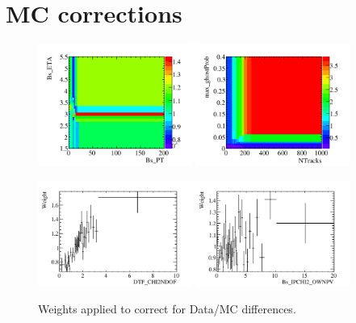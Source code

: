 
\section{MC corrections}

\begin{figure}[h]
\centering
\includegraphics[height=!,width=0.45\textwidth]{figs/dataVsMC/norm_final/weights/weights_Bs_PT_Bs_ETA_Ds2KKpi_1_t0.pdf}
\includegraphics[height=!,width=0.45\textwidth]{figs/dataVsMC/norm_final/weights/weights_NTracks_max_ghostProb_Ds2KKpi_1_t0.pdf}

\includegraphics[height=!,width=0.45\textwidth]{figs/dataVsMC/norm_final/weights/weights_DTF_CHI2NDOF_Ds2KKpi_1_t0.pdf}
\includegraphics[height=!,width=0.45\textwidth]{figs/dataVsMC/norm_final/weights/weights_Bs_IPCHI2_OWNPV_Ds2KKpi_1_t0.pdf}
\caption{Weights applied to correct for Data/MC differences.}
\label{fig:}
\end{figure}

